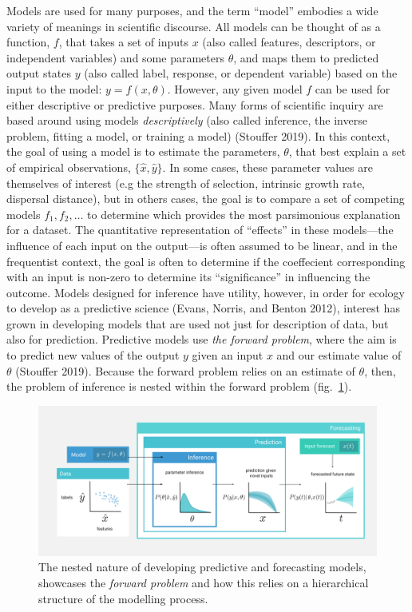 \documentclass[11pt]{article}
\makeatletter
\def\maxwidth{\ifdim\Gin@nat@width>\linewidth\linewidth
\else\Gin@nat@width\fi}
\let\Oldincludegraphics\includegraphics
\renewcommand{\includegraphics}[1]{\Oldincludegraphics[width=\maxwidth]{#1}}
\makeatother
\begin{document}
Models are used for many purposes, and the term ``model'' embodies a
wide variety of meanings in scientific discourse. All models can be
thought of as a function, \(f\), that takes a set of inputs \(x\) (also
called features, descriptors, or independent variables) and some
parameters \(\theta\), and maps them to predicted output states \(y\)
(also called label, response, or dependent variable) based on the input
to the model: \(y=f(x,\theta)\). However, any given model \(f\) can be
used for either descriptive or predictive purposes. Many forms of
scientific inquiry are based around using models \emph{descriptively}
(also called inference, the inverse problem, fitting a model, or
training a model) (Stouffer 2019). In this context, the goal of using a
model is to estimate the parameters, \(\theta\), that best explain a set
of empirical observations, \(\{\hat{x}, \hat{y}\}\). In some cases,
these parameter values are themselves of interest (e.g the strength of
selection, intrinsic growth rate, dispersal distance), but in others
cases, the goal is to compare a set of competing models
\(f_1, f_2, \dots\) to determine which provides the most parsimonious
explanation for a dataset. The quantitative representation of
``effects'' in these models---the influence of each input on the
output---is often assumed to be linear, and in the frequentist context,
the goal is often to determine if the coeffecient corresponding with an
input is non-zero to determine its ``significance'' in influencing the
outcome. Models designed for inference have utility, however, in order
for ecology to develop as a predictive science (Evans, Norris, and
Benton 2012), interest has grown in developing models that are used not
just for description of data, but also for prediction. Predictive models
use \emph{the forward problem}, where the aim is to predict new values
of the output \(y\) given an input \(x\) and our estimate value of
\(\theta\) (Stouffer 2019). Because the forward problem relies on an
estimate of \(\theta\), then, the problem of inference is nested within
the forward problem (fig.~\ref{fig:models}).

\begin{figure}
\hypertarget{fig:models}{%
\centering
\includegraphics{figures/forecasting_v3.png}
\caption{The nested nature of developing predictive and forecasting
models, showcases the \emph{forward problem} and how this relies on a
hierarchical structure of the modelling process.}\label{fig:models}
}
\end{figure}
\end{document}
